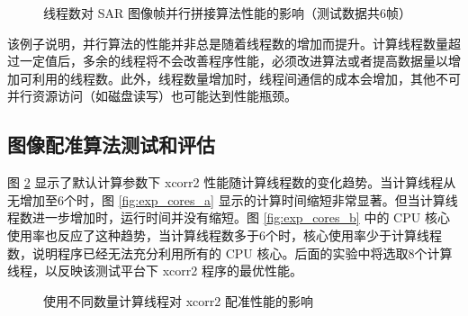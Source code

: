 \begin{figure}[htbp]
\centering
\subfloat[程序计算时间]{
    \label{fig:exp_merge_a}
    \begin{minipage}[t]{0.49\textwidth}
        \centering
        \resizebox {\textwidth} {!} {
            
        }
    \end{minipage}
}
\caption{线程数对 SAR 图像帧并行拼接算法性能的影响（测试数据共6帧）} \label{fig:exp_merge}
\end{figure}
 
该例子说明，并行算法的性能并非总是随着线程数的增加而提升。计算线程数量超过一定值后，多余的线程将不会改善程序性能，必须改进算法或者提高数据量以增加可利用的线程数。此外，线程数量增加时，线程间通信的成本会增加，其他不可并行资源访问（如磁盘读写）也可能达到性能瓶颈。

\subsection{图像配准算法测试和评估}

图 \ref{fig:exp_cores} 显示了默认计算参数下 xcorr2 性能随计算线程数的变化趋势。当计算线程从无增加至6个时，图 \ref{fig:exp_cores_a} 显示的计算时间缩短非常显著。但当计算线程数进一步增加时，运行时间并没有缩短。图 \ref{fig:exp_cores_b} 中的 CPU 核心使用率也反应了这种趋势，当计算线程数多于6个时，核心使用率少于计算线程数，说明程序已经无法充分利用所有的 CPU 核心。后面的实验中将选取8个计算线程，以反映该测试平台下 xcorr2 程序的最优性能。

\begin{figure}[htbp]
\centering
\subfloat[程序计算时间]{
    \label{fig:exp_cores_a}
    \begin{minipage}[t]{0.49\textwidth}
        \centering
        \resizebox {\textwidth} {!} {
            
        }
    \end{minipage}
}

\caption{使用不同数量计算线程对 xcorr2 配准性能的影响}
\label{fig:exp_cores}
\end{figure}
 
